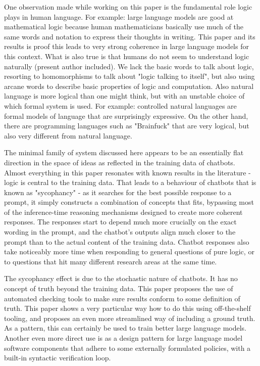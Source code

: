 One observation made while working on this paper is the fundamental role logic plays in human language. For example: large language models are good at mathematical logic because human mathematicians basically use much of the same words and notation to express their thoughts in writing. This paper and its results is proof this leads to very strong coherence in large language models for this context. What is also true is that humans do not seem to understand logic naturally (present author included). We lack the basic words to talk about logic, resorting to homomorphisms to talk about "logic talking to itself", but also using arcane words to describe basic properties of logic and computation. Also natural language is more logical than one might think, but with an unstable choice of which formal system is used. For example: controlled natural languages are formal models of language that are surprisingly expressive. On the other hand, there are programming languages such as "Brainfuck" that are very logical, but also very different from natural language. 

The minimal family of system discussed here appears to be an essentially flat direction in the space of ideas as reflected in the training data of chatbots. Almost everything in this paper resonates with known results in the literature - logic is central to the training data. That leads to a behaviour of chatbots that is known as "sycophancy" - as it searches for the best possible response to a prompt, it simply constructs a combination of concepts that fits, bypassing most of the inference-time reasoning mechanisms designed to create more coherent responses. The responses start to depend much more crucially on the exact wording in the prompt, and the chatbot's outputs align much closer to the prompt than to the actual content of the training data. Chatbot responses also take noticeably more time when responding to general questions of pure logic, or to questions that hit many different research areas at the same time. 

The sycophancy effect is due to the stochastic nature of chatbots. It has no concept of truth beyond the training data. This paper proposes the use of automated checking tools to make sure results conform to some definition of truth. This paper shows a very particular way how to do this using off-the-shelf tooling, and proposes an even more streamlined way of including a ground truth. As a pattern, this can certainly be used to train better large language models. Another even more direct use is as a design pattern for large language model software components that adhere to some externally formulated policies, with a built-in syntactic verification loop. 


